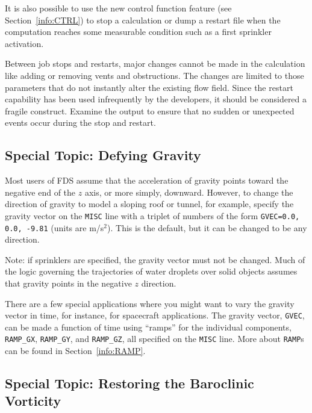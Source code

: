 \documentclass[11pt]{book}
\newcommand{\ct}{\tt\small}
\begin{document}
It is also possible to use the new control function feature (see Section~\ref{info:CTRL})
to stop a calculation or dump a restart file when the computation reaches
some measurable condition such as a first sprinkler activation.

Between job stops and restarts, major changes cannot be made in the calculation
like adding or removing vents and obstructions. The changes are limited to those parameters that do
not instantly alter the existing flow field. Since the restart
capability has been used infrequently by the developers, it should be considered
a fragile construct. Examine the output
to ensure that no sudden or unexpected events occur during the stop and
restart.


\subsection{Special Topic: Defying Gravity}
\label{info:GVEC}

Most users of FDS assume that the acceleration of gravity points toward
the negative end of the $z$ axis, or more simply, downward.
However, to change the direction of gravity to model
a sloping roof or tunnel, for example, specify the gravity
vector on the {\ct MISC} line with a triplet of numbers of the form
{\ct GVEC=0.0, 0.0, -9.81} (units are m/s$^2$). This is the default, but it
can be changed to be any direction.

Note: if sprinklers are specified, the gravity vector must not be
changed. Much of the logic governing the trajectories of water droplets
over solid objects assumes that gravity points in the negative $z$
direction.

There are a few special applications where you might want to vary the gravity vector in
time, for instance, for spacecraft applications. The gravity vector, {\ct GVEC}, can be
made a function of time using ``ramps'' for the individual components, {\ct RAMP\_GX},
{\ct RAMP\_GY}, and {\ct RAMP\_GZ}, all specified on the {\ct MISC} line. More about
{\ct RAMP}s can be found in Section~\ref{info:RAMP}.


\subsection{Special Topic: Restoring the Baroclinic Vorticity}
\end{document}
